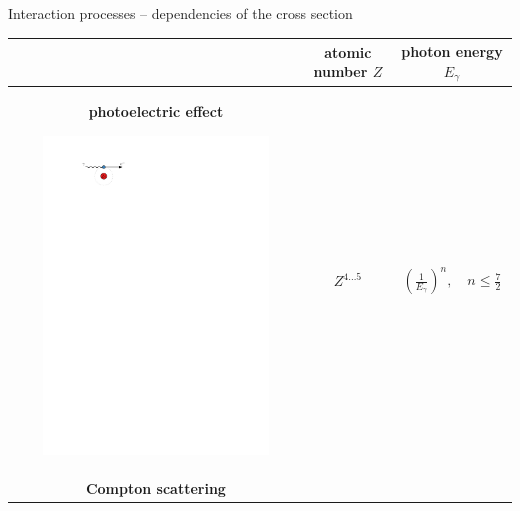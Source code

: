 \documentclass[11pt,xcolor=dvipsnames,professionalfonts]{beamer}
\begin{document}
\begin{frame}{Interaction processes -- dependencies of the cross section}
	\begin{center}
		\begin{tabular}{ccc}
			\toprule
			& atomic number $Z$ & photon energy $E_\gamma$\\
			\midrule
			\begin{minipage}{0.3\textwidth}
				\centering
				\textbf{photoelectric effect}
				
				\vspace{0.1cm}
				
				\includegraphics[width=0.8\textwidth]{./figures/photoeffect_intro.pdf} 
				
				\vspace{0.4cm}
			\end{minipage} & $Z^{4 \dots 5}$ & $\left(\frac{1}{E_\gamma}\right)^{n}, \quad n \leq \frac{7}{2}$ \\
			
			\begin{minipage}{0.3\textwidth}
				\centering
				\textbf{Compton scattering}
				
				\vspace{0.1cm}
				

\end{minipage}
\end{tabular}
\end{center}
\end{frame}
\end{document}

